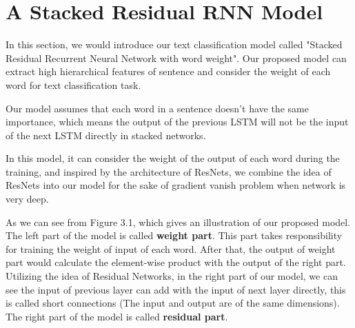 \documentclass[senior]{IPSstyle}
\begin{document}


\chapter{A Stacked Residual RNN Model}

In this section, we would introduce our text classification model called "Stacked Residual Recurrent Neural Network with word weight". Our proposed model can extract high hierarchical features of sentence and consider the weight of each word for text classification task. 

Our model assumes that each word in a sentence doesn’t have the same importance, which means the output of the previous LSTM will not be the input of the next LSTM directly in stacked networks.

In this model, it can consider the weight of the output of each word during the training, and inspired by the architecture of ResNets, we combine the idea of ResNets into our model for the sake of gradient vanish problem when network is very deep.

As we can see from Figure 3.1, which gives an illustration of our proposed model. The left part of the model is called \textbf{weight part}. This part takes responsibility for training the weight of input of each word. After that, the output of weight part would calculate the element-wise product with the output of the right part. Utilizing the idea of Residual Networks, in the right part of our model, we can see the input of previous layer can add with the input of next layer directly, this is called short connections (The input and output are of the same dimensions). The right part of the model is called \textbf{residual part}.
\end{document}
